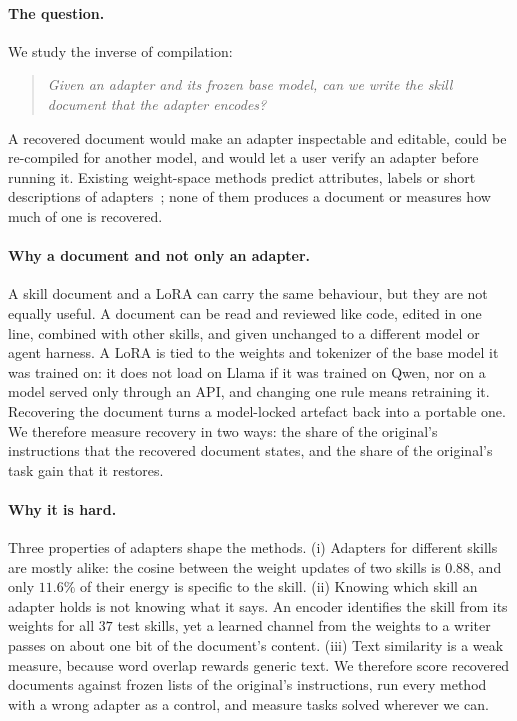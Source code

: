 \documentclass[11pt]{article}
\begin{document}
\paragraph{The question.} We study the inverse of compilation:
\begin{quote}\itshape
Given an adapter and its frozen base model, can we write the skill document that the adapter encodes?
\end{quote}
A recovered document would make an adapter inspectable and editable, could be re-compiled for another model, and would let a user verify an
adapter before running it. Existing weight-space methods predict attributes, labels or short descriptions of adapters~\cite{w2t,loracles,dit,weightwatch,spectral};
none of them produces a document or measures how much of one is recovered.

\paragraph{Why a document and not only an adapter.} A skill document and a LoRA can carry the same behaviour, but they are not equally useful.
A document can be read and reviewed like code, edited in one line, combined with other skills, and given unchanged to a different model or
agent harness. A LoRA is tied to the weights and tokenizer of the base model it was trained on: it does not load on Llama if it was trained
on Qwen, nor on a model served only through an API, and changing one rule means retraining it. Recovering the document turns a model-locked
artefact back into a portable one. We therefore measure recovery in two ways: the share of the original's instructions that the recovered
document states, and the share of the original's task gain that it restores.

\paragraph{Why it is hard.} Three properties of adapters shape the methods. (i) Adapters for different skills are mostly alike: the cosine
between the weight updates of two skills is $0.88$, and only $11.6\%$ of their energy is specific to the skill. (ii) Knowing which skill an
adapter holds is not knowing what it says. An encoder identifies the skill from its weights for all $37$ test skills, yet a learned channel from
the weights to a writer passes on about one bit of the document's content. (iii) Text similarity is a weak measure, because word overlap rewards generic text. We therefore score
recovered documents against frozen lists of the original's instructions, run every method with a wrong adapter as a control, and measure tasks
solved wherever we can.
\end{document}
